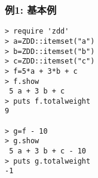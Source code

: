 \subsubsection*{例1: 基本例}



\begin{Verbatim}[baselinestretch=0.7,frame=single]
> require 'zdd'
> a=ZDD::itemset("a")
> b=ZDD::itemset("b")
> c=ZDD::itemset("c")
> f=5*a + 3*b + c
> f.show
 5 a + 3 b + c
> puts f.totalweight
9

> g=f - 10
> g.show
 5 a + 3 b + c - 10
> puts g.totalweight
-1
\end{Verbatim}

